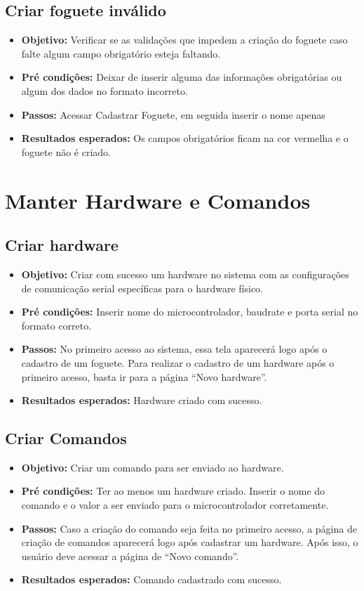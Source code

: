 \begin{apendicesenv}
\subsection{Criar foguete inválido}
\begin{itemize} 
    \item \textbf{Objetivo:} Verificar se as validações que impedem a criação do foguete caso falte algum campo obrigatório esteja faltando.
    \item \textbf{Pré condições:} Deixar de inserir alguma das informações obrigatórias ou algum dos dados no formato incorreto.
    \item \textbf{Passos:} Acessar Cadastrar Foguete, em seguida inserir o nome apenas
    \item \textbf{Resultados esperados:} Os campos obrigatórios ficam na cor vermelha e o foguete não é criado.
\end{itemize}


\section{Manter Hardware e Comandos}
\subsection{Criar hardware}
\begin{itemize} 
    \item \textbf{Objetivo:} Criar com sucesso um hardware no sistema com as configurações de comunicação serial específicas para o hardware físico.
    \item \textbf{Pré condições:} Inserir nome do microcontrolador, baudrate e porta serial no formato correto.
    \item \textbf{Passos:} No primeiro acesso ao sistema, essa tela aparecerá logo após o cadastro de um foguete. Para realizar o cadastro de um hardware após o primeiro acesso, basta ir para a página “Novo hardware”.
    \item \textbf{Resultados esperados:} Hardware criado com sucesso.
\end{itemize}

\subsection{Criar Comandos}
\begin{itemize} 
    \item \textbf{Objetivo:} Criar um comando para ser enviado ao hardware.
    \item \textbf{Pré condições:} Ter ao menos um hardware criado. Inserir o nome do comando e o valor a ser enviado para o microcontrolador corretamente.
    \item \textbf{Passos:} Caso a criação do comando seja feita no primeiro acesso, a página de criação de comandos aparecerá logo após cadastrar um hardware. Após isso, o usuário deve acessar a página de “Novo comando”. 
    \item \textbf{Resultados esperados:} Comando cadastrado com sucesso.
\end{itemize}


\end{apendicesenv}
